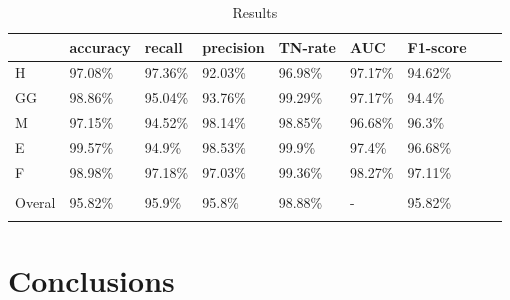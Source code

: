 \documentclass[conference]{IEEEtran}
\begin{document}
\begin{table}[tbh]
\caption{Results}
\label{cm:result}
\small
\centering
\begin{tabular}{@{}lllllllll@{}}
\toprule
&accuracy&recall  &precision & TN-rate &   AUC   &  F1-score \\ \midrule

H & 97.08\% & 97.36\% & 92.03\% & 96.98\% & 97.17\% & 94.62\% \\ 
GG & 98.86\% & 95.04\% & 93.76\% & 99.29\% & 97.17\% & 94.4\% \\ 
M & 97.15\% & 94.52\% & 98.14\% & 98.85\% & 96.68\% & 96.3\% \\ 
E & 99.57\% & 94.9\% & 98.53\% & 99.9\% & 97.4\% & 96.68\% \\ 
F & 98.98\% & 97.18\% & 97.03\% & 99.36\% & 98.27\% & 97.11\% \\   \bottomrule
\vspace{-0.25cm} \\ 
Overal & 95.82\% & 95.9\% & 95.8\% & 98.88\% & - & 95.82\% \\ 
\vspace{-0.3cm} \\ 
\bottomrule


\end{tabular}
\end{table}







\vspace{1cm}
\section{Conclusions}
\vspace{1cm}











\vspace{12pt}
\end{document}
